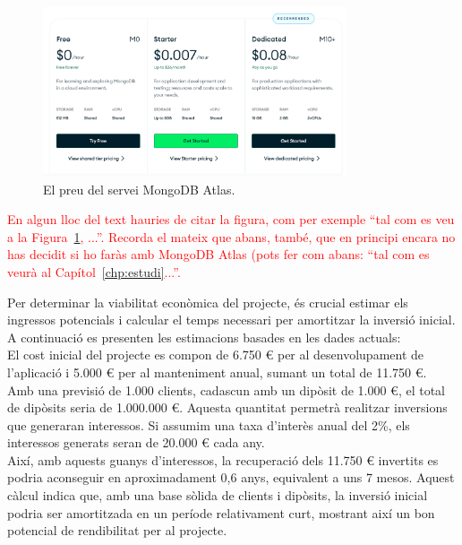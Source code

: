 \documentclass[a4paper,12pt,twoside]{ThesisStyle}
\newcommand{\pau}[1]{\textcolor{red}{#1}}
\begin{document}
\begin{figure}[h!] %
    \centering
    \includegraphics[width=0.8\textwidth]{imatges/mongodb.png} %
    \caption{El preu del servei MongoDB Atlas.} %
    \label{fig:El preu del servei MongoDB Atlas} %
  \end{figure}

\pau{En algun lloc del text hauries de citar la figura, com per exemple ``tal com es veu a la Figura~\ref{fig:El preu del servei MongoDB Atlas}, ...''. Recorda el mateix que abans, també, que en principi encara no has decidit si ho faràs amb MongoDB Atlas (pots fer com abans: ``tal com es veurà al Capítol~\ref{chp:estudi}...''.}



Per determinar la viabilitat econòmica del projecte, és crucial estimar els ingressos potencials i calcular el temps necessari per amortitzar la inversió inicial. A continuació es presenten les estimacions basades en les dades actuals:\\

El cost inicial del projecte es compon de 6.750 € per al desenvolupament de l'aplicació i 5.000 € per al manteniment anual, sumant un total de 11.750 €.\\

Amb una previsió de 1.000 clients, cadascun amb un dipòsit de 1.000 €, el total de dipòsits seria de 1.000.000 €. Aquesta quantitat permetrà realitzar inversions que generaran interessos. Si assumim una taxa d'interès anual del 2\%, els interessos generats seran de 20.000 € cada any.\\

Així, amb aquests guanys d'interessos, la recuperació dels 11.750 € invertits es podria aconseguir en aproximadament 0,6 anys, equivalent a uns 7 mesos. Aquest càlcul indica que, amb una base sòlida de clients i dipòsits, la inversió inicial podria ser amortitzada en un període relativament curt, mostrant així un bon potencial de rendibilitat per al projecte.\\
\end{document}
